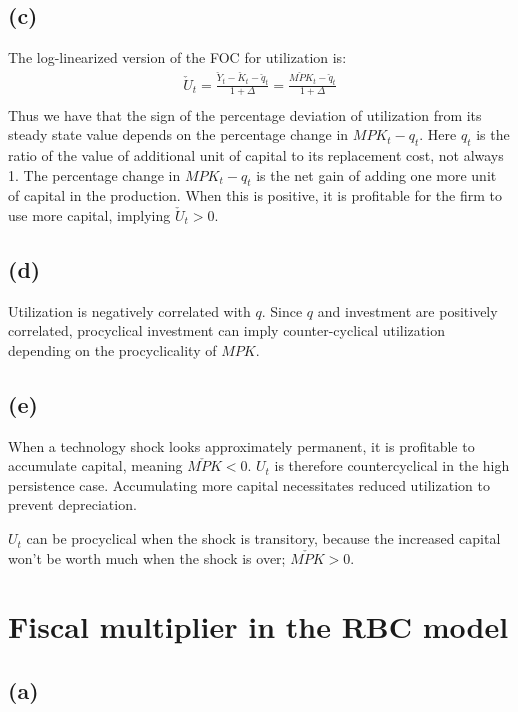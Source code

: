 \documentclass[11pt]{amsart}
\begin{document}
	\subsection*{(c)}
	 The log-linearized version of the FOC for utilization is:
	\begin{align*}
	\check U_t = \frac{\check Y_t  - \check K_t - \check q_t}{1 + \Delta} = \frac{\check{MPK}_t - \check q_t}{1 + \Delta} \\
	\end{align*}
	Thus we have that the sign of the percentage deviation of utilization from its steady state value depends on the percentage change in $ MPK_t -  q_t$.  
	Here $q_t$ is the ratio of the value of additional unit of capital to its replacement cost, not always 1. 
	The percentage change in $ MPK_t -  q_t$ is the net gain of adding one more unit of capital in the production. When this is positive, it is profitable for the firm to use more capital, implying $\check U_t >0$. 
	
	\subsection*{(d)} 
	Utilization is negatively correlated with $q$. 
	Since $q$ and investment are positively correlated, procyclical investment can imply counter-cyclical utilization depending on the procyclicality of $MPK$. 
	
	\subsection*{(e)} When a technology shock looks approximately permanent, it is profitable to accumulate capital, meaning $\check{MPK} <0$. 
	$U_t$ is therefore countercyclical in the high persistence case. 
	Accumulating more capital necessitates reduced utilization to prevent depreciation. 
	
	$U_t$ can be procyclical when the shock is transitory, because the increased capital won't be worth much when the shock is over; $\check{MPK} >0$.
	



\section{Fiscal multiplier in the RBC model}

\subsection*{(a)}
\end{document}
